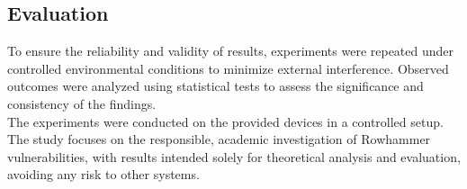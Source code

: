   \subsection{Evaluation} \label{subsec:evaluation}
    To ensure the reliability and validity of results, experiments were repeated under 
    controlled environmental conditions to minimize external interference. Observed 
    outcomes were analyzed using statistical tests to assess the significance and
    consistency of the findings.
    \\
    The experiments were conducted on the provided devices in a controlled setup. 
    The study focuses on the responsible, academic investigation of Rowhammer 
    vulnerabilities, with results intended solely for theoretical analysis and 
    evaluation, avoiding any risk to other systems.

